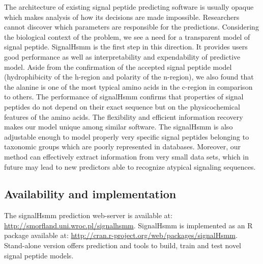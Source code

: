 \documentclass[fleqn,10pt,twoside]{gcb15submission}
\begin{document}
The architecture of existing signal peptide predicting software is usually opaque which makes analysis of how its decisions are made impossible. Researchers cannot discover which parameters are responsible for the predictions. Considering the biological context of the problem, we see a need for a transparent model of signal peptide. SignalHsmm is the first step in this direction. 
It provides users good performance as well as interpretability and expendability of predictive model. 
Aside from the confirmation of the accepted signal peptide model (hydrophibicity of the h-region and polarity of the n-region), we also found that the alanine is one of the most typical amino acids in the c-region in comparison to others.
The performance of signalHsmm confirms that properties of signal peptides do not depend on their exact sequence but on the physicochemical features of the amino acids. 
The flexibility and efficient information recovery makes our model unique among similar software. The signalHsmm is also adjustable enough to model properly very specific signal peptides belonging to taxonomic groups which are poorly represented in databases. Moreover, our method can effectively extract information from very small data sets, which in future may lead to new predictors able to recognize atypical signaling sequences.

\subsection*{Availability and implementation}
The signalHsmm prediction web-server is available at: \url{http://smorfland.uni.wroc.pl/signalhsmm}. SignalHsmm is implemented as an R package available at: \url{http://cran.r-project.org/web/packages/signalHsmm}. Stand-alone version offers prediction and tools to build, train and test novel signal peptide models.



\end{document}
